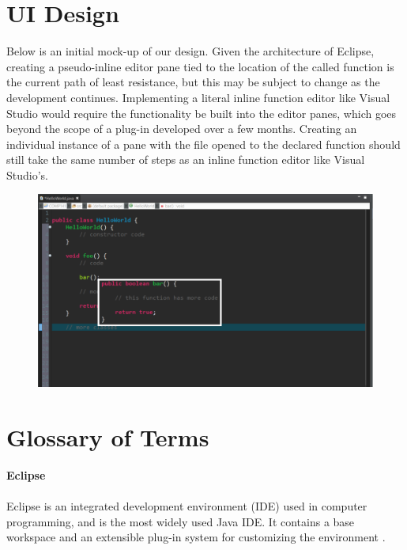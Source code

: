 \documentclass[]{report}
\begin{document}
\chapter{UI Design}

	Below is an initial mock-up of our design.  Given the architecture of Eclipse, creating a pseudo-inline editor pane tied to the location of the called function is the current path of least resistance, but this may be subject to change as the development continues.  Implementing a literal inline function editor like Visual Studio would require the functionality be built into the editor panes, which goes beyond the scope of a plug-in developed over a few months.  Creating an individual instance of a pane with the file opened to the declared function should still take the same number of steps as an inline function editor like Visual Studio's.

	\begin{figure}[h!]
		\includegraphics[width=\linewidth]{imgs/ui_mockup.png}
	\end{figure}



\chapter{Glossary of Terms}

	\noindent\textbf{Eclipse}\\ \\
	Eclipse is an integrated development environment (IDE) used in computer programming, and is the most widely used Java IDE.  It contains a base workspace and an extensible plug-in system for customizing the environment \citep{eclipse}. \\ \\
\end{document}
